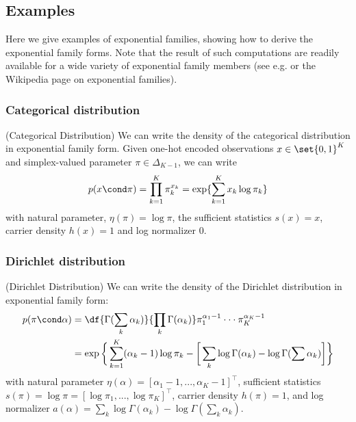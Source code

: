 \documentclass{article} %
\newcommand{\logNormalizerFunction}{a}
\newcommand{\sufficientStatsFunction}{s}
\newcommand{\carrierDensity}{h}
\begin{document}
\subsection{Examples}

Here we give examples of exponential families, showing how to derive the exponential family forms.   Note that the result of such computations are readily available for a wide variety of exponential family members (see e.g. \cite{nielsen2009statistical} or the Wikipedia page on exponential families). 

 
\subsubsection{Categorical distribution}

\begin{example}{(Categorical Distribution)}
\label{ex:categorical_as_ef} We can write the density of the categorical distribution in exponential family form. 	 Given one-hot encoded observations $x \in \set{0,1}^K$ and simplex-valued parameter $\pi \in \Delta_{K-1}$, we can write
\[p(x \cond \pi) = \prod_{k=1}^K \pi_k^{x_k} = \exp \{ \sum_{k=1}^K x_k \log \pi_k\} \]
 with natural parameter, $\eta(\pi) = \log \pi$, the sufficient statistics $\sufficientStatsFunction(x) = x$, carrier density $\carrierDensity(x)=1$ and log normalizer $0$.
\end{example}

\subsubsection{Dirichlet distribution}
\begin{example}{(Dirichlet Distribution)} 
\label{ex:dirichlet_as_ef} We can write the density of the Dirichlet distribution in exponential family form:
\begin{align*}
p (\pi \cond\alpha) &= \df{\Gamma(\sum_k \alpha_k)}{\prod_k \Gamma (\alpha_k) } \pi_1^{\alpha_1 -1} \cdot \cdot \cdot \pi_K^{\alpha_K -1} \\
&= \exp \bigg\{ \sum_{k=1}^K (\alpha_k -1) \log \pi_k - \bigg[ \sum_k \log \Gamma (\alpha_k)-  \log \Gamma (\sum \alpha_k) \bigg]  \bigg\}
\end{align*}
with natural parameter $\eta(\alpha) = [\alpha_1 -1, ..., \alpha_K -1]^\top$, sufficient statistics $\sufficientStatsFunction(\pi) = \log \pi = [\log \pi_1, ..., \log \pi_K]^\top$, carrier density $\carrierDensity(\pi)=1$, and log normalizer $\logNormalizerFunction(\alpha) =  \sum_k \log \Gamma (\alpha_k ) - \log \Gamma (\sum_k \alpha_k)$. 
  
\end{example} 
\end{document}

